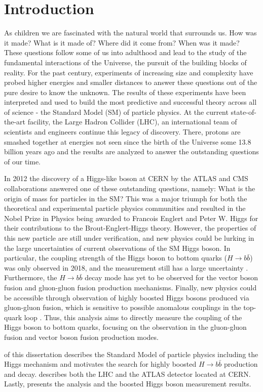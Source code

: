 \chapter{Introduction} \label{sec:intro}
As children we are fascinated with the natural world that surrounds us.  How
was it made? What is it made of? Where did it come from?  When was it made?
These questions follow some of us into adulthood and lead to the study of the
fundamental interactions of the Universe, the pursuit of the building blocks of
reality.  For the past century, experiments of increasing size and complexity
have probed higher energies and smaller distances to answer these questions out
of the pure desire to know the unknown.  The results of these experiments have
been interpreted and used to build the most predictive and successful theory
across all of science - the Standard Model (SM) of particle physics. At the
current state-of-the-art facility, the Large Hadron Collider (LHC), an
international team of scientists and engineers continue this legacy of
discovery.  There, protons are smashed together at energies not seen since the
birth of the Universe some 13.8 billion years ago and the results are analyzed
to answer the outstanding questions of our time.

In 2012 the discovery of a Higgs-like boson \cite{Higgs:1964ia, Higgs:1964pj,
Higgs:1966ev, Englert:1964et, Guralnik:1964eu} at CERN by the ATLAS and CMS
\cite{Aad:2012tfa,Chatrchyan:2012xdj} collaborations answered one of these
outstanding questions, namely: What is the origin of mass for particles in the
SM?  This was a major triumph for both the theoretical and experimental
particle physics communities and resulted in the Nobel Prize in Physics being
awarded to Francois Englert and Peter W. Higgs for their contributions to the
Brout-Englert-Higgs theory. However, the properties of this new particle are
still under verification, and new physics could be lurking in the large
uncertainties of current observations of the SM Higgs boson.  In particular,
the coupling strength of the Higgs boson to bottom quarks ($H \rightarrow
b\bar{b}$) was only observed in 2018, and the measurement still has a large
uncertainty \cite{HIGG-2018-04, CMS:2018abb}. Furthermore, the $H \rightarrow
b\bar{b}$ decay mode has yet to be observed for the vector boson fusion and
gluon-gluon fusion production mechanisms.  Finally, new physics could be
accessible through observation of highly boosted Higgs bosons produced via
gluon-gluon fusion, which is sensitive to possible anomalous couplings in the
top-quark loop \cite{Grojean:2013nya, Schlaffer:2014osa}.  Thus, this analysis
aims to directly measure the coupling of the Higgs boson to bottom quarks,
focusing on the observation in the gluon-gluon fusion and vector boson fusion
production modes. 

 of this dissertation describes the Standard Model of
particle physics including the Higgs mechanism and motivates the search for
highly boosted $H \rightarrow b\bar{b}$ production and decay.
 describes both the LHC and the ATLAS detector located at
CERN. Lastly,  presents the analysis and the boosted
Higgs boson measurement results.
